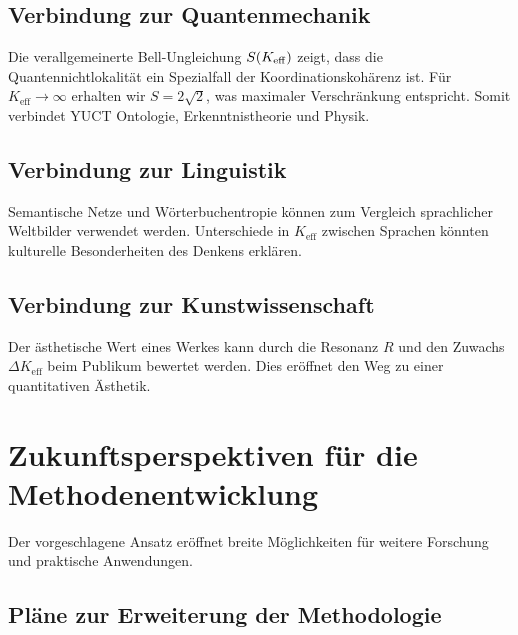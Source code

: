 \documentclass[12pt,a4paper]{article}
\begin{document}
	\subsection{Verbindung zur Quantenmechanik}
	
	Die verallgemeinerte Bell-Ungleichung \(S(\Keff)\) zeigt, dass die Quantennichtlokalität ein Spezialfall der Koordinationskohärenz ist. Für \(K_{\mathrm{eff}} \to \infty\) erhalten wir \(S = 2\sqrt{2}\), was maximaler Verschränkung entspricht. Somit verbindet YUCT Ontologie, Erkenntnistheorie und Physik.
	
	\subsection{Verbindung zur Linguistik}
	
	Semantische Netze und Wörterbuchentropie können zum Vergleich sprachlicher Weltbilder verwendet werden. Unterschiede in \(K_{\mathrm{eff}}\) zwischen Sprachen könnten kulturelle Besonderheiten des Denkens erklären.
	
	\subsection{Verbindung zur Kunstwissenschaft}
	
	Der ästhetische Wert eines Werkes kann durch die Resonanz \(R\) und den Zuwachs \(\Delta K_{\mathrm{eff}}\) beim Publikum bewertet werden. Dies eröffnet den Weg zu einer quantitativen Ästhetik.
	
	\section{Zukunftsperspektiven für die Methodenentwicklung}
	\label{sec:future-directions}
	
	Der vorgeschlagene Ansatz eröffnet breite Möglichkeiten für weitere Forschung und praktische Anwendungen.
	
	\subsection{Pläne zur Erweiterung der Methodologie}
	
\end{document}
